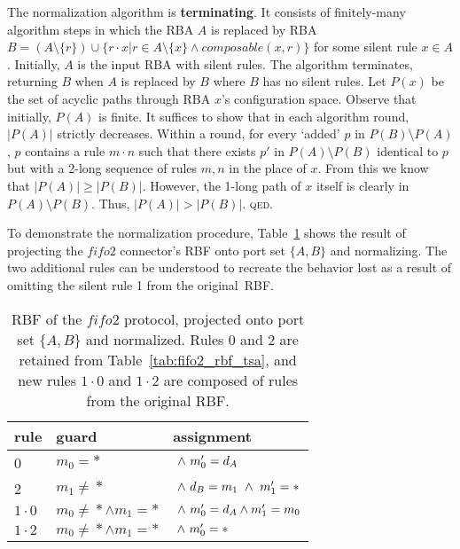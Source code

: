 The normalization algorithm is \textbf{terminating}. It consists of finitely-many algorithm steps in which the RBA $A$ is replaced by RBA $B=(A \setminus{}\{r\}) \cup{} \{r\cdot{}x | r\in{} A\setminus{}\{x\} \wedge{} composable(x,r)\}$ for some silent rule $x \in{} A$. Initially, $A$ is the input RBA with silent rules. The algorithm terminates, returning $B$ when $A$ is replaced by $B$ where $B$ has no silent rules. Let $P(x)$ be the set of acyclic paths through RBA $x$'s configuration space. Observe that initially, $P(A)$ is finite. It suffices to show that in each algorithm round, $|P(A)|$ strictly decreases. Within a round, for every `added' $p$ in $P(B)\setminus{}P(A)$, $p$ contains a rule $m\cdot{}n$ such that there exists $p'$ in $P(A)\setminus{}P(B)$ identical to $p$ but with a 2-long sequence of rules $m, n$ in the place of $x$. From this we know that $|P(A)| \geq |P(B)|$. However, the 1-long path of $x$ itself is clearly in $P(A)\setminus{} P(B)$. Thus, $|P(A)| > |P(B)|$. \textsc{qed}.

To demonstrate the normalization procedure, Table~\ref{tab:fifo2_rbf_tsa_norm} shows the result of projecting the $fifo2$ connector's RBF onto port set $\{A,B\}$ and normalizing. The two additional rules can be understood to recreate the behavior lost as a result of omitting the silent rule 1 from the original~RBF.


\begin{table}
	\centering
	\begin{tabular}{l|ll|}
		rule & guard & assignment \\
		\hline
		0 & $m_0=*$ & $\ \wedge{}\ {}m_0'=d_A$\\
		2 & $m_1\neq{}*$ & $\ \wedge{}\ {}d_B=m_1\ \wedge{}\ {}m_1'=*$ \\
		\hline
		$1\cdot{}0$ & $m_0\neq{}*\wedge{}m_1=*$ & $\ \wedge{}\ {}m_0'=d_A\wedge{}m_1'=m_0$ \\
		$1\cdot{}2$ & $m_0\neq{}*\wedge{}m_1=*$ & $\ \wedge{}\ {}m_0'=*$ \\
		\hline
	\end{tabular}
	\caption[RBF of fifo2 connector, projected and normalized.]{RBF of the $fifo2$ protocol, projected onto port set $\{A,B\}$ and normalized. Rules 0 and 2 are retained from Table~\ref{tab:fifo2_rbf_tsa}, and new rules $1\cdot{}0$ and $1\cdot{}2$ are composed of rules from the original RBF.}
	\label{tab:fifo2_rbf_tsa_norm}
\end{table}


